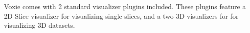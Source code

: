 Voxie comes with 2 standard visualizer plugins included. These plugins feature a 2D Slice visualizer for visualizing single slices, and a two 3D visualizers for for visualizing 3D datasets.